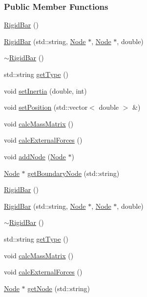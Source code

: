 \subsubsection*{Public Member Functions}
\begin{DoxyCompactItemize}
\item 
\hyperlink{classmknix_1_1_rigid_bar_abb021e56fd2e7f7a098125e7de3db5e1}{Rigid\-Bar} ()
\item 
\hyperlink{classmknix_1_1_rigid_bar_ac47bc0c8fc15e799f67a76925b5919bf}{Rigid\-Bar} (std\-::string, \hyperlink{classmknix_1_1_node}{Node} $\ast$, \hyperlink{classmknix_1_1_node}{Node} $\ast$, double)
\item 
\hyperlink{classmknix_1_1_rigid_bar_aa349d4406824acbd0b29d25d9a2f2da4}{$\sim$\-Rigid\-Bar} ()
\item 
std\-::string \hyperlink{classmknix_1_1_rigid_bar_acc95a2895043626253a4bb8ee1eb341a}{get\-Type} ()
\item 
void \hyperlink{classmknix_1_1_rigid_bar_a0b125aafa37253d47041ba107f8eaed4}{set\-Inertia} (double, int)
\item 
void \hyperlink{classmknix_1_1_rigid_bar_a7cee7a990c62bdac1ebf6a90903a9e15}{set\-Position} (std\-::vector$<$ double $>$ \&)
\item 
void \hyperlink{classmknix_1_1_rigid_bar_a3d368a1a10b600179fbb7e901472c301}{calc\-Mass\-Matrix} ()
\item 
void \hyperlink{classmknix_1_1_rigid_bar_a4325fbe1df7832ce09bd2bf72b00cf67}{calc\-External\-Forces} ()
\item 
void \hyperlink{classmknix_1_1_rigid_bar_a1f05aae37c654229c4f6c3ef32944125}{add\-Node} (\hyperlink{classmknix_1_1_node}{Node} $\ast$)
\item 
\hyperlink{classmknix_1_1_node}{Node} $\ast$ \hyperlink{classmknix_1_1_rigid_bar_a59e73c31c6acea5b9d6ca1dbfa6421a4}{get\-Boundary\-Node} (std\-::string)
\item 
\hyperlink{classmknix_1_1_rigid_bar_abb021e56fd2e7f7a098125e7de3db5e1}{Rigid\-Bar} ()
\item 
\hyperlink{classmknix_1_1_rigid_bar_ac47bc0c8fc15e799f67a76925b5919bf}{Rigid\-Bar} (std\-::string, \hyperlink{classmknix_1_1_node}{Node} $\ast$, \hyperlink{classmknix_1_1_node}{Node} $\ast$, double)
\item 
\hyperlink{classmknix_1_1_rigid_bar_aa349d4406824acbd0b29d25d9a2f2da4}{$\sim$\-Rigid\-Bar} ()
\item 
std\-::string \hyperlink{classmknix_1_1_rigid_bar_acc95a2895043626253a4bb8ee1eb341a}{get\-Type} ()
\item 
void \hyperlink{classmknix_1_1_rigid_bar_a3d368a1a10b600179fbb7e901472c301}{calc\-Mass\-Matrix} ()
\item 
void \hyperlink{classmknix_1_1_rigid_bar_a4325fbe1df7832ce09bd2bf72b00cf67}{calc\-External\-Forces} ()
\item 
\hyperlink{classmknix_1_1_node}{Node} $\ast$ \hyperlink{classmknix_1_1_rigid_bar_a3b644ec91ee5acc3efb7fdeb6b495e8a}{get\-Node} (std\-::string)
\end{DoxyCompactItemize}
